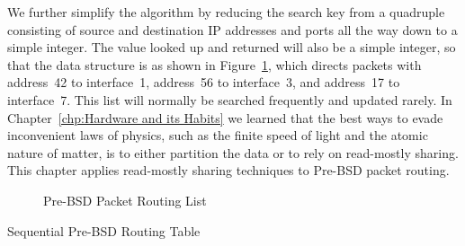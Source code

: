 We further simplify the algorithm by reducing the search key from
a quadruple consisting of source and destination IP addresses and
ports all the way down to a simple integer.
The value looked up and returned will also be a simple integer,
so that the data structure is as shown in
Figure~\ref{fig:defer:Pre-BSD Packet Routing List}, which
directs packets with address~42 to interface~1, address~56 to
interface~3, and address~17 to interface~7.
This list will normally be searched frequently and updated rarely.
In Chapter~\ref{chp:Hardware and its Habits}
we learned that the best ways to evade inconvenient laws of physics, such as
the finite speed of light and the atomic nature of matter, is to
either partition the data or to rely on read-mostly sharing.
This chapter applies read-mostly sharing techniques to Pre-BSD packet
routing.

\begin{figure}[tb]
\centering
{}
\caption{Pre-BSD Packet Routing List}
\label{fig:defer:Pre-BSD Packet Routing List}
\end{figure}

\begin{listing}[tb]

\caption{Sequential Pre-BSD Routing Table}
\label{lst:defer:Sequential Pre-BSD Routing Table}
\end{listing}

